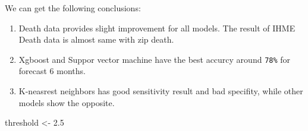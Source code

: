 \documentclass[
]{article}
\newenvironment{Shaded}{\begin{snugshade}}{\end{snugshade}}
\newcommand{\FloatTok}[1]{\textcolor[rgb]{0.00,0.00,0.81}{#1}}
\newcommand{\NormalTok}[1]{#1}
\newcommand{\OtherTok}[1]{\textcolor[rgb]{0.56,0.35,0.01}{#1}}
\begin{document}
We can get the following conclusions:

\begin{enumerate}
\def\labelenumi{\arabic{enumi}.}
\item
  Death data provides slight improvement for all models. The result of
  IHME Death data is almost same with zip death.
\item
  Xgboost and Suppor vector machine have the best accurcy around
  \texttt{78\%} for forecast 6 months.
\item
  K-neasrest neighbors has good sensitivity result and bad specifity,
  while other models show the opposite.
\end{enumerate}

\begin{Shaded}
\begin{Highlighting}[]
\NormalTok{threshold }\OtherTok{\textless{}{-}} \FloatTok{2.5}
\end{Highlighting}
\end{Shaded}
\end{document}
